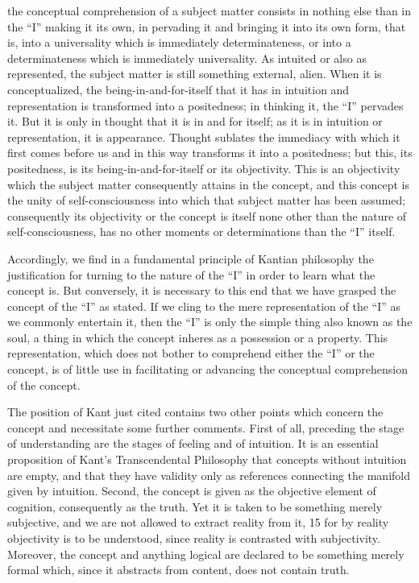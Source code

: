 the conceptual comprehension of a subject matter consists in nothing else
than in the “I” making it its own, in pervading it and bringing it into its
own form, that is, into a universality which is immediately determinateness,
or into a determinateness which is immediately universality. As intuited
or also as represented, the subject matter is still something external, alien.
When it is conceptualized, the being-in-and-for-itself that it has in intuition
and representation is transformed into a positedness; in thinking it, the “I”
pervades it. But it is only in thought that it is in and for itself; as it
is in intuition or representation, it is appearance. Thought sublates the
immediacy with which it first comes before us and in this way transforms
it into a positedness; but this, its positedness, is its being-in-and-for-itself or
its objectivity. This is an objectivity which the subject matter consequently
attains in the concept, and this concept is the unity of self-consciousness into
which that subject matter has been assumed; consequently its objectivity
or the concept is itself none other than the nature of self-consciousness,
has no other moments or determinations than the “I” itself.

Accordingly, we find in a fundamental principle of Kantian philosophy
the justification for turning to the nature of the “I” in order to learn
what the concept is. But conversely, it is necessary to this end that we have
grasped the concept of the “I” as stated. If we cling to the mere representation
of the “I” as we commonly entertain it, then the “I” is only the simple thing
also known as the soul, a thing in which the concept inheres as a possession
or a property. This representation, which does not bother to comprehend
either the “I” or the concept, is of little use in facilitating or advancing the
conceptual comprehension of the concept.

The position of Kant just cited contains two other points which concern
the concept and necessitate some further comments.
First of all, preceding
the stage of understanding are the stages of feeling and of intuition. It is
an essential proposition of Kant's Transcendental Philosophy that concepts
without intuition are empty, and that they have validity only as references
connecting the manifold given by intuition.
Second, the concept is given
as the objective element of cognition, consequently as the truth. Yet it is
taken to be something merely subjective, and we are not allowed to extract
reality from it, 15 for by reality objectivity is to be understood, since reality
is contrasted with subjectivity.
Moreover, the concept and anything logical are declared to be something
merely formal which, since it abstracts from content, does not contain truth.

